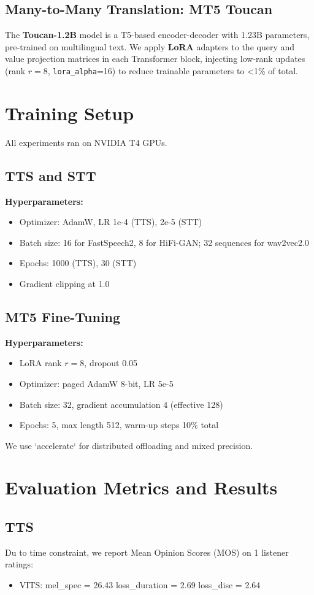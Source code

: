\documentclass[11pt,a4paper]{article}
\begin{document}
\subsection{Many-to-Many Translation: MT5 Toucan}
The \textbf{Toucan-1.2B} model is a T5-based encoder-decoder with 1.23B parameters, pre-trained on multilingual text. We apply \textbf{LoRA} adapters to the query and value projection matrices in each Transformer block, injecting low-rank updates (rank $r=8$, \texttt{lora\_alpha}=16) to reduce trainable parameters to <1\% of total\cite{hu2021lora}.

\section{Training Setup}
All experiments ran on NVIDIA T4 GPUs.
\subsection{TTS and STT}
\textbf{Hyperparameters:}
\begin{itemize}
  \item Optimizer: AdamW, LR 1e-4 (TTS), 2e-5 (STT)
  \item Batch size: 16 for FastSpeech2, 8 for HiFi-GAN; 32 sequences for wav2vec2.0
  \item Epochs: 1000 (TTS), 30 (STT)
  \item Gradient clipping at 1.0
\end{itemize}

\subsection{MT5 Fine-Tuning}
\textbf{Hyperparameters:}
\begin{itemize}
  \item LoRA rank $r=8$, dropout 0.05
  \item Optimizer: paged AdamW 8-bit, LR 5e-5
  \item Batch size: 32, gradient accumulation 4 (effective 128)
  \item Epochs: 5, max length 512, warm-up steps 10\% total
\end{itemize}
We use `accelerate` for distributed offloading and mixed precision.

\section{Evaluation Metrics and Results}
\subsection{TTS}
Du to time constraint, we report Mean Opinion Scores (MOS) on 1 listener ratings:
\begin{itemize}
  \item VITS: mel_spec = 26.43 \textpm loss_duration = 2.69 \textpm loss_disc = 2.64
\end{itemize}
\end{document}
